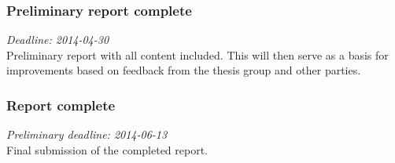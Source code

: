 \documentclass[a4paper,11pt]{article}
\begin{document}
\subsubsection*{Preliminary report complete}
\noindent
\emph{Deadline: 2014-04-30}\\
\noindent
Preliminary report with all content included.
This will then serve as a basis for improvements based on feedback from the thesis group and other parties.

\subsubsection*{Report complete}
\noindent
\emph{Preliminary deadline: 2014-06-13}\\
\noindent
Final submission of the completed report.
\end{document}
